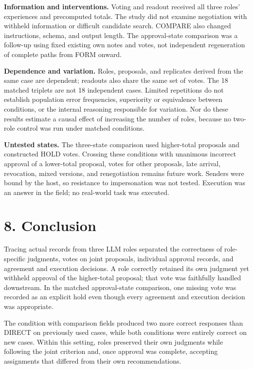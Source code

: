 \documentclass[10pt,a4paper]{article}
\begin{document}
\textbf{Information and interventions.} Voting and readout received all three roles' experiences and precomputed totals. The study did not examine negotiation with withheld information or difficult candidate search. COMPARE also changed instructions, schema, and output length. The approval-state comparison was a follow-up using fixed existing own notes and votes, not independent regeneration of complete paths from FORM onward.

\textbf{Dependence and variation.} Roles, proposals, and replicates derived from the same case are dependent; readouts also share the same set of votes. The 18 matched triplets are not 18 independent cases. Limited repetitions do not establish population error frequencies, superiority or equivalence between conditions, or the internal reasoning responsible for variation. Nor do these results estimate a causal effect of increasing the number of roles, because no two-role control was run under matched conditions.

\textbf{Untested states.} The three-state comparison used higher-total proposals and constructed HOLD votes. Crossing these conditions with unanimous incorrect approval of a lower-total proposal, votes for other proposals, late arrival, revocation, mixed versions, and renegotiation remains future work. Senders were bound by the host, so resistance to impersonation was not tested. Execution was an answer in the \texttt{} field; no real-world task was executed.

\section{8. Conclusion}\label{paper-04-conclusion}

Tracing actual records from three LLM roles separated the correctness of role-specific judgments, votes on joint proposals, individual approval records, and agreement and execution decisions. A role correctly retained its own judgment yet withheld approval of the higher-total proposal; that vote was faithfully handled downstream. In the matched approval-state comparison, one missing vote was recorded as an explicit hold even though every agreement and execution decision was appropriate.

The condition with comparison fields produced two more correct responses than DIRECT on previously used cases, while both conditions were entirely correct on new cases. Within this setting, roles preserved their own judgments while following the joint criterion and, once approval was complete, accepting assignments that differed from their own recommendations.
\end{document}

